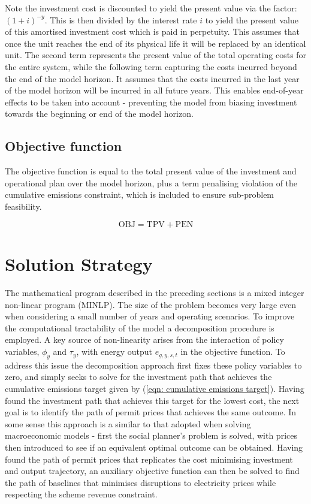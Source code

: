 \documentclass{article}
\newcommand{\iGenerator}{g}
\newcommand{\iYear}{y}
\newcommand{\iScenario}{s}
\newcommand{\iInterval}{t}
\newcommand{\cInterestRate}{i}
\newcommand{\cTotalPresentValue}[1][]{\mathrm{TPV}_{#1}}
\newcommand{\cEmissionsViolationTotalCost}{\mathrm{PEN}}
\newcommand{\cObjectiveFunction}{\mathrm{OBJ}}
\newcommand{\vBaseline}[1][\iYear]{\phi_{#1}}
\newcommand{\vPermitPrice}[1][\iYear]{\tau_{#1}}
\newcommand{\vEnergy}[1][\iGenerator,\iYear,\iScenario,\iInterval]{e_{#1}}
\begin{document}
Note the investment cost is discounted to yield the present value via the factor: $(1+\cInterestRate)^{-\iYear}$. This is then divided by the interest rate $i$ to yield the present value of this amortised investment cost which is paid in perpetuity. This assumes that once the unit reaches the end of its physical life it will be replaced by an identical unit. The second term represents the present value of the total operating costs for the entire system, while the following term capturing the costs incurred beyond the end of the model horizon. It assumes that the costs incurred in the last year of the model horizon will be incurred in all future years. This enables end-of-year effects to be taken into account - preventing the model from biasing investment towards the beginning or end of the model horizon.

\subsection{Objective function}
The objective function is equal to the total present value of the investment and operational plan over the model horizon, plus a term penalising violation of the cumulative emissions constraint, which is included to ensure sub-problem feasibility.

\begin{equation}
	\cObjectiveFunction = \cTotalPresentValue + \cEmissionsViolationTotalCost
\end{equation}

\section{Solution Strategy}
The mathematical program described in the preceding sections is a mixed integer non-linear program (MINLP). The size of the problem becomes very large even when considering a small number of years and operating scenarios. To improve the computational tractability of the model a decomposition procedure is employed. A key source of non-linearity arises from the interaction of policy variables, $\vBaseline$ and $\vPermitPrice$, with energy output $\vEnergy$ in the objective function. To address this issue the decomposition approach first fixes these policy variables to zero, and simply seeks to solve for the investment path that achieves the cumulative emissions target given by (\ref{eqn: cumulative emissions target}). Having found the investment path that achieves this target for the lowest cost, the next goal is to identify the path of permit prices that achieves the same outcome. In some sense this approach is a similar to that adopted when solving macroeconomic models - first the social planner's problem is solved, with prices then introduced to see if an equivalent optimal outcome can be obtained. Having found the path of permit prices that replicates the cost minimising investment and output trajectory, an auxiliary objective function can then be solved to find the path of baselines that minimises disruptions to electricity prices while respecting the scheme revenue constraint.
\end{document}

